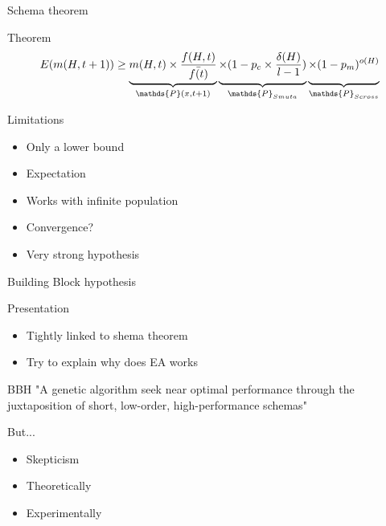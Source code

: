\begin{frame}{Schema theorem}
  \begin{block}{Theorem}
    $$E(m(H,t+1)) \geq \underbrace{m(H,t) \times \frac{f(H,t)}{\bar{f(t)}}}_{\mathds{P}(x,t+1)}
    \underbrace{\times (1 - p_c \times \frac{\delta(H)}{l-1})\vphantom{\frac{f(H,t)}{\bar{f(t)}}}}_{\mathds{P}_{Smuta}}
    \underbrace{\times (1 - p_m)^{o(H)}\vphantom{\frac{f(H,t)}{\bar{f(t)}}}}_{\mathds{P}_{Scross}}$$
  \end{block}

  \begin{block}{Limitations}
    \begin{itemize}
      \item Only a lower bound
      \item Expectation
      \item Works with infinite population
      \item Convergence?
      \item Very strong hypothesis
    \end{itemize}
  \end{block}
\end{frame}

\begin{frame}{Building Block hypothesis}
  \begin{block}{Presentation}
    \begin{itemize}
    \item Tightly linked to shema theorem
    \item Try to explain why does EA works
    \end{itemize}
  \end{block}

  \begin{block}{BBH}
    "A genetic algorithm seek near optimal performance through the juxtaposition of short, low-order, high-performance schemas"\cite{goldberg1989}
  \end{block}

  \begin{block}{But...}
    \begin{itemize}
      \item Skepticism
      \item Theoretically\cite{wright2003}
      \item Experimentally\cite{forrest1993}
    \end{itemize}
  \end{block}
\end{frame}

